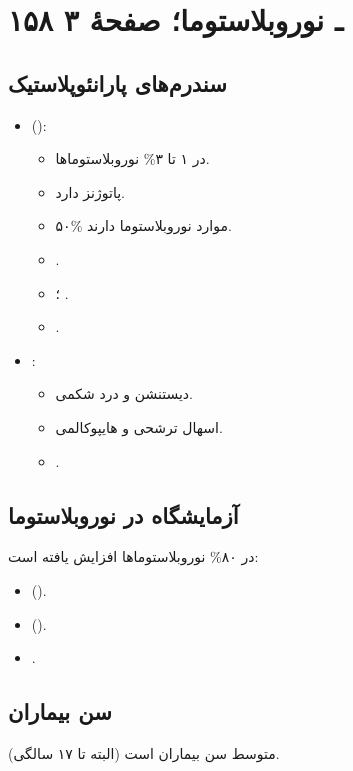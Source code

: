 \documentclass[12pt,a4paper]{article}
\begin{document}
\clearpage
\section*{۱۵۸ ـ نوروبلاستوما؛ صفحهٔ ۳}
\subsection*{سندرم‌های پارانئوپلاستیک}
\begin{itemize}
\item {} ():
  \begin{itemize}
  \item در ۱ تا ۳\% نوروبلاستوماها.
  \item پاتوژنز  دارد.
  \item ۵۰\% موارد  نوروبلاستوما دارند.
  \item {}.
  \item {}؛
    .
  \item {} .
  \end{itemize}
\item {}:
  \begin{itemize}
  \item دیستنشن و درد شکمی.
  \item اسهال ترشحی و هایپوکالمی.
  \item {}.
  \end{itemize}
\end{itemize}

\subsection*{آزمایشگاه در نوروبلاستوما}
در ۸۰\% نوروبلاستوماها افزایش یافته است:
\begin{itemize}
\item {} ().
\item {} ().
\item {}.
\end{itemize}

\subsection*{سن بیماران}
متوسط سن بیماران  است (البته تا ۱۷ سالگی).
\end{document}
